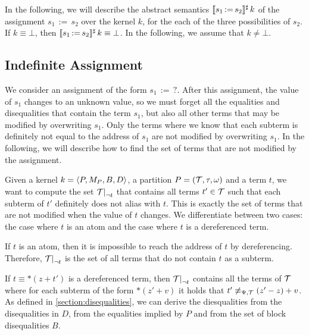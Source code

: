 In the following, we will describe the abstract semantics $\llbracket s_1\,{:=}\,s_2\rrbracket^\sharp\,k$ of the assignment $s_1\,{:=}\,s_2$ over the kernel $k$, for the each of the three possibilities of $s_2$.
If $k \equiv \bot$, then $\llbracket s_1\,{:=}\,s_2\rrbracket^\sharp\,k \equiv \bot$.
In the following, we assume that $k \neq \bot$.

\subsection{Indefinite Assignment}

We consider an assignment of the form $s_1\,{:=}\,?$.
After this assignment, the value of $s_1$ changes to an unknown value,
so we must forget all the equalities and disequalities that contain the term $s_1$,
but also all other terms that may be modified by overwriting $s_1$.
Only the terms where we know that each subterm is definitely not equal to the address of $s_1$ are not modified by overwriting $s_1$.
In the following, we will describe how to find the set of terms
that are not modified by the assignment.


Given a kernel $k = \langle P, M_P, B, D\rangle$, a partition $P = (\mathcal{T}, \tau, \omega)$ and a term $t$,
we want to compute the set $\restr{\T}{\neg t}$ that contains all terms $t' \in \mathcal{T}$ such that each subterm of $t'$ definitely does not alias with $t$.
This is exactly the set of terms that are not modified when the value of $t$ changes.
We differentiate between two cases: the case where $t$ is an atom and the case where $t$ is a dereferenced term.

If $t$ is an atom, then it is impossible to reach the address of $t$ by dereferencing.
Therefore, $\restr{\T}{\neg t}$ is the set of all terms that do not contain $t$ as a subterm.

If $t \equiv *(z + t')$ is a dereferenced term, then $\restr{\T}{\neg t}$ contains all the terms of $\mathcal{T}$ where for each subterm of the form $*(z' + v)$ it holds that $t' \not\equiv_{\Psi,\mathcal{T}} (z' - z) + v$.
As defined in \cref{section:disequalities}, we can derive the diesqualities from the disequalities in $D$, from the equalities
implied by $P$ and from the set of block disequalities $B$.

